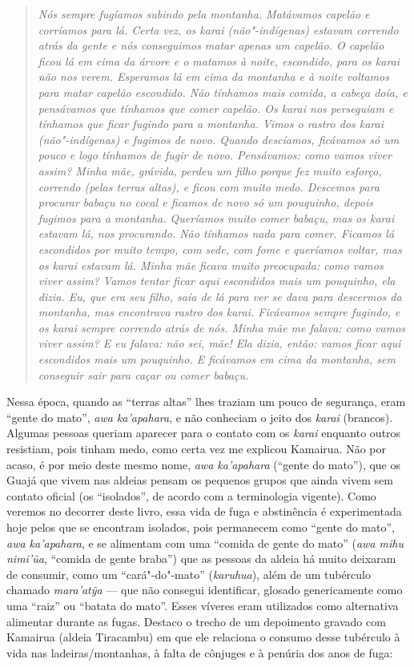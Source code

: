 \begin{quote}
\emph{Nós sempre fugíamos subindo pela montanha. Matávamos capelão e
corríamos para lá. Certa vez, os karai (não"-indígenas) estavam correndo
atrás da gente e nós conseguimos matar apenas um capelão. O capelão
ficou lá em cima da árvore e o matamos à noite, escondido, para os karai
não nos verem. Esperamos lá em cima da montanha e à noite voltamos para
matar capelão escondido. Não tínhamos mais comida, a cabeça doía, e
pensávamos que tínhamos que comer capelão. Os karai nos perseguiam e
tínhamos que ficar fugindo para a montanha. Vimos o rastro dos karai
(não"-indígenas) e fugimos de novo. Quando descíamos, ficávamos só um
pouco e logo tínhamos de fugir de novo. Pensávamos: como vamos viver
assim? Minha mãe, grávida, perdeu um filho porque fez muito esforço,
correndo (pelas terras altas), e ficou com muito medo. Descemos para
procurar babaçu no cocal e ficamos de novo só um pouquinho, depois
fugimos para a montanha. Queríamos muito comer babaçu, mas os karai
estavam lá, nos procurando. Não tínhamos nada para comer. Ficamos lá
escondidos por muito tempo, com sede, com fome e queríamos voltar, mas
os karai estavam lá. Minha mãe ficava muito preocupada: como vamos viver
assim? Vamos tentar ficar aqui escondidos mais um pouquinho, ela dizia.
Eu, que era seu filho, saía de lá para ver se dava para descermos da
montanha, mas encontrava rastro dos karai. Ficávamos sempre fugindo, e
os karai sempre correndo atrás de nós. Minha mãe me falava: como vamos
viver assim? E eu falava: não sei, mãe! Ela dizia, então: vamos ficar
aqui escondidos mais um pouquinho. E ficávamos em cima da montanha, sem
conseguir sair para caçar ou comer babaçu.}
\end{quote}

Nessa época, quando as ``terras altas'' lhes traziam um pouco de
segurança, eram ``gente do mato'', \emph{awa ka'apahara}, e não conheciam
o jeito dos \emph{karai} (brancos). Algumas pessoas queriam aparecer
para o contato com os \emph{karai} enquanto outros resistiam, pois
tinham medo, como certa vez me explicou Kamairua. Não por acaso, é por
meio deste mesmo nome, \emph{awa ka'apahara} (``gente do mato''), que os
Guajá que vivem nas aldeias pensam os pequenos grupos que ainda vivem
sem contato oficial (os ``isolados'', de acordo com a terminologia
vigente). Como veremos no decorrer deste livro, essa vida de fuga e
abstinência é experimentada hoje pelos que se encontram isolados, pois
permanecem como ``gente do mato'', \emph{awa ka'apahara}, e se alimentam
com uma ``comida de gente do mato'' (\emph{awa mihu nimi'ũa}, ``comida
de gente braba'') que as pessoas da aldeia há muito deixaram de
consumir, como um ``cará"-do"-mato'' (\emph{karuhua}), além de um
tubérculo chamado \emph{mara'atỹa} --- que não consegui identificar,
glosado genericamente como uma ``raiz'' ou ``batata do mato''. Esses víveres
eram utilizados como alternativa alimentar durante as fugas. Destaco o
trecho de um depoimento gravado com Kamairua (aldeia Tiracambu) em que
ele relaciona o consumo desse tubérculo à vida nas ladeiras/montanhas, à
falta de cônjuges e à penúria dos anos de fuga:

